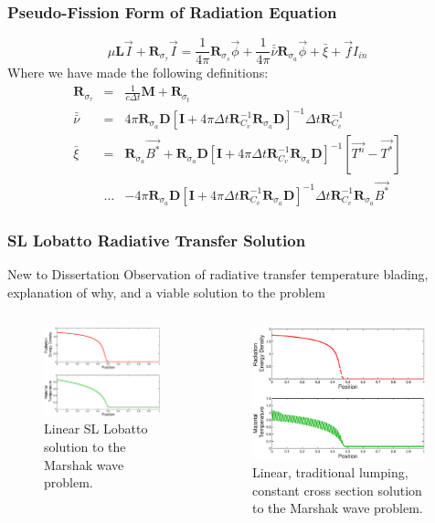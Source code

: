 \documentclass{beamer}
\newcommand{\benum}{\begin{equation}}   %
\newcommand{\eenum}{\end{equation}}
\newcommand{\bea}{\begin{eqnarray*}}  %
\newcommand{\eea}{\end{eqnarray*}}
\newcommand{\M}{\ensuremath{ \mathbf{M} }}
\newcommand{\R}{\ensuremath{ \mathbf{R} }}
\newcommand{\Lm}{\ensuremath{ \mathbf{L} }}
\newcommand{\D}{\ensuremath{ \mathbf{D} }}
\newcommand{\I}{\ensuremath{ \mathbf{I} }}
\newif\ifplacelogo %
\begin{document}
\begin{frame}
\frametitle{Pseudo-Fission Form of Radiation Equation}
\benum
\mu \Lm \vec{I} +\R_{\sigma_{\tau}} \vec{I} = \frac{1}{4\pi}\R_{\sigma_s} \vec{\phi} + \frac{1}{4\pi}\bar{\bar{\nu}} \R_{\sigma_a}\vec{\phi} + \bar{\xi} + \vec{f} I_{in}
\label{eq:pseudo_fission}
\eenum
Where we have made the following definitions:
\bea
\R_{\sigma_{\tau} }&=& \frac{1}{c\Delta t}\M + \R_{\sigma_t} \\
\bar{\bar{\nu}} &=& 4\pi \R_{\sigma_a}\D  \left[ \I+ 4\pi \Delta t \R_{C_v}^{-1} \R_{\sigma_a} \D  \right]^{-1}  \Delta t \R_{C_v}^{-1} \\
\bar{\xi} &=& \R_{\sigma_a} \vec{B^*}  + \R_{\sigma_a}\D  \left[ \I+ 4\pi \Delta t \R_{C_v}^{-1} \R_{\sigma_a} \D  \right]^{-1}  \left[  \vec{T^n}-\vec{T^*} \right] \\
&\dots & -4\pi \R_{\sigma_a} \D \left[ \I+ 4\pi \Delta t \R_{C_v}^{-1} \R_{\sigma_a} \D  \right]^{-1} \Delta t \R_{C_v}^{-1}\R_{\sigma_a} \vec{B^*}  
\eea

\end{frame}
\placelogofalse
\begin{frame}
\frametitle{SL Lobatto Radiative Transfer Solution}
\begin{block}{New to Dissertation}
Observation of radiative transfer temperature blading, explanation of why, and a viable solution to the problem
\end{block}
\begin{columns}[c]
\begin{figure}[!htp]
\includegraphics[width=5cm]{Proposal_ex_sol.eps}
\caption{Linear SL Lobatto solution to the Marshak wave problem.}
\end{figure}
\begin{figure}[!htp]
\includegraphics[width=5cm]{Proposal_blades.eps}
\caption{Linear, traditional lumping, constant cross section solution to the Marshak wave problem.}
\end{figure}
\end{columns}
\end{frame}
\end{document}
